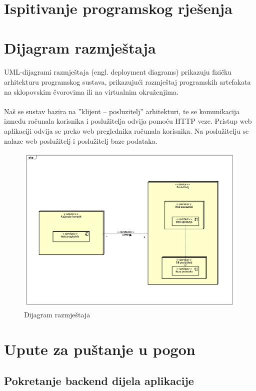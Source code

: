 \section{Ispitivanje programskog rješenja}

\section{Dijagram razmještaja}

\paragraph{}{
UML-dijagrami razmještaja (engl. deployment diagrams) prikazuju fizičku arhitekturu programskog sustava, prikazujući razmještaj programskih artefakata na sklopovskim čvorovima ili na virtualnim okruženjima.
}

\paragraph{}{
Naš se sustav bazira na ”klijent – posluzitelj” arhitekturi, te se komunikacija između računala korisnika i poslužitelja odvija pomoću HTTP veze. Pristup web aplikaciji odvija se preko web preglednika računala korisnika. Na poslužitelju se nalaze web poslužitelj i poslužitelj baze podataka.
}

\begin{figure}[!htb]
	\centering
	\includegraphics[width=1\linewidth]{dijagrami/DijagramRazmjestaja.png}
	\caption{Dijagram razmještaja}
	\label{fig:modelsdiagram}
\end{figure}

\section{Upute za puštanje u pogon}

\subsection{Pokretanje backend dijela aplikacije}

\paragraph{}{

}





\eject